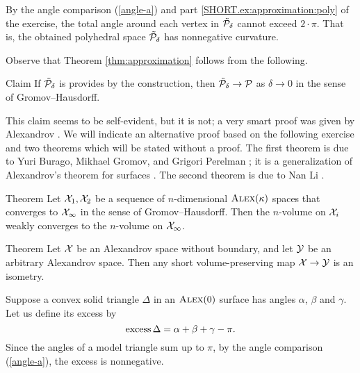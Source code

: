 By the angle comparison (\ref{angle-a}) and part \ref{SHORT.ex:approximation:poly} of the exercise, the total angle around each vertex in $\tilde {\mathcal{P}}_\delta$ cannot exceed $2\cdot\pi$.
That is, the obtained polyhedral space $\tilde {\mathcal{P}}_\delta$ has nonnegative curvature.
\qeds

Observe that Theorem \ref{thm:approximation} follows from the following.

\begin{thm}{Claim}\label{clm:approximation}
If $\tilde {\mathcal{P}}_\delta$ is provides by the construction, then $\tilde {\mathcal{P}}_\delta\to\mathcal{P}$ as $\delta\to 0$ in the sense of Gromov--Hausdorff.
\end{thm}

This claim seems to be self-evident, but it is not;
a very smart proof was given by Alexandrov \cite[VII §~6]{alexandrov-1948}.
We will indicate an alternative proof based on the following exercise and two theorems which will be stated without a proof.
The first theorem is due to Yuri Burago, Mikhael Gromov, and Grigori Perelman \cite[10.8]{burago-gromov-perelman};
it is a generalization of Alexandrov's theorem for surfaces \cite[X §~2]{alexandrov-1948}.
The second theorem is due to Nan Li \cite[Corollary 0.1]{li}.

\begin{thm}{Theorem}\label{thm:cont-vol}
Let $\mathcal{X}_1, \mathcal{X}_2$ be a sequence of $n$-dimensional $\textsc{Alex}(\kappa)$ spaces that converges to $\mathcal{X}_\infty$ in the sense of Gromov--Hausdorff.
Then the $n$-volume on $\mathcal{X}_i$ weakly converges to the $n$-volume on $\mathcal{X}_\infty$.
\end{thm}

\begin{thm}{Theorem}\label{thm:vol-short}
Let $\mathcal{X}$ be an Alexandrov space without boundary, and let $\mathcal{Y}$ be an arbitrary Alexandrov space.
Then any short volume-preserving map $\mathcal{X}\to\mathcal{Y}$ is an isometry.
\end{thm}

Suppose a convex solid triangle $\Delta$ in an $\textsc{Alex}(0)$ surface has angles $\alpha$, $\beta$ and $\gamma$.
Let us define its excess by
\[\operatorname{\rm excess}\nolimits\Delta=\alpha+\beta+\gamma-\pi.\]
Since the angles of a model triangle sum up to $\pi$, by the angle comparison (\ref{angle-a}),
the excess is nonnegative.

